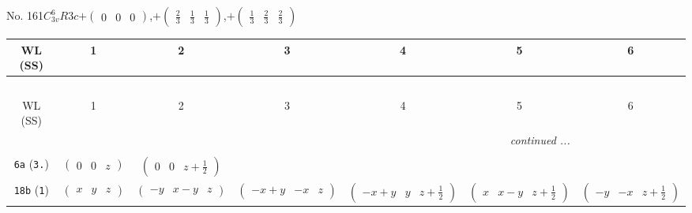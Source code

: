 \documentclass[fleqn,9pt,landscape]{jsarticle}
\begin{document}
\newpage
No. 161\quad$C_{3v}^{6}$\quad$R3c$\quad[ trigonal ]\quad$+\begin{pmatrix} 0 & 0 & 0 \end{pmatrix}$,\quad $+\begin{pmatrix} \frac{2}{3} & \frac{1}{3} & \frac{1}{3} \end{pmatrix}$,\quad $+\begin{pmatrix} \frac{1}{3} & \frac{2}{3} & \frac{2}{3} \end{pmatrix}$
\begin{center}
\renewcommand{\arraystretch}{1.2}
\begin{longtable}{ccccccc}
 \hline \hline
WL (SS) & 1 & 2 & 3 & 4 & 5 & 6 \\ \hline \endfirsthead

\multicolumn{6}{l}{\tablename\ \thetable{}} \\
 \hline \hline
WL (SS) & 1 & 2 & 3 & 4 & 5 & 6 \\ \hline \endhead

 \hline \hline
\multicolumn{6}{r}{\footnotesize\it continued ...} \\ \endfoot

 \hline \hline
\multicolumn{6}{r}{} \\ \endlastfoot

{\tt 6a} ({\tt 3.}) & $ \begin{pmatrix} 0 & 0 & z \end{pmatrix} $ & $ \begin{pmatrix} 0 & 0 & z + \frac{1}{2} \end{pmatrix} $ & $  $ & $  $ & $  $ & $  $ \\ \hline
{\tt 18b} ({\tt 1}) & $ \begin{pmatrix} x & y & z \end{pmatrix} $ & $ \begin{pmatrix} - y & x - y & z \end{pmatrix} $ & $ \begin{pmatrix} - x + y & - x & z \end{pmatrix} $ & $ \begin{pmatrix} - x + y & y & z + \frac{1}{2} \end{pmatrix} $ & $ \begin{pmatrix} x & x - y & z + \frac{1}{2} \end{pmatrix} $ & $ \begin{pmatrix} - y & - x & z + \frac{1}{2} \end{pmatrix} $ \\
\end{longtable}
\end{center}
\end{document}
